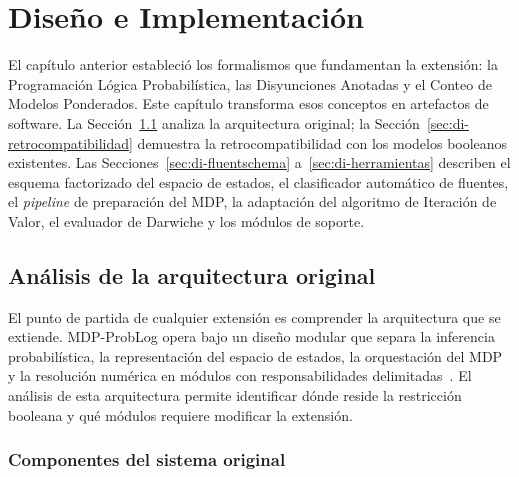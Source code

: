 \section{Diseño e Implementación}
\label{ch:diseno-implementacion}

El capítulo anterior estableció los formalismos que fundamentan la extensión:
la Programación Lógica Probabilística, las Disyunciones Anotadas y el Conteo
de Modelos Ponderados. Este capítulo transforma esos conceptos en artefactos
de software. La Sección~\ref{sec:di-analisis-arquitectura} analiza la
arquitectura original; la Sección~\ref{sec:di-retrocompatibilidad} demuestra
la retrocompatibilidad con los modelos booleanos existentes. Las
Secciones~\ref{sec:di-fluentschema} a~\ref{sec:di-herramientas} describen el
esquema factorizado del espacio de estados, el clasificador automático de
fluentes, el \textit{pipeline} de preparación del MDP, la adaptación del
algoritmo de Iteración de Valor, el evaluador de Darwiche y los módulos de
soporte.

\subsection{Análisis de la arquitectura original}
\label{sec:di-analisis-arquitectura}

El punto de partida de cualquier extensión es comprender la arquitectura que se
extiende. MDP-ProbLog opera bajo un diseño modular que separa la inferencia
probabilística, la representación del espacio de estados, la orquestación del MDP
y la resolución numérica en módulos con responsabilidades delimitadas~\cite{bueno2016mdp}.
El análisis de esta arquitectura permite identificar dónde reside la
restricción booleana y qué módulos requiere modificar la extensión.

\subsubsection{Componentes del sistema original}
\label{sec:di-arquitectura-base}


